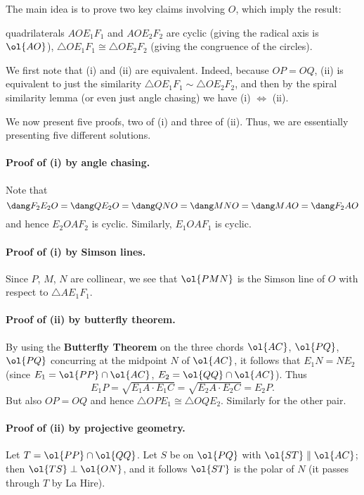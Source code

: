 The main idea is to prove two key claims involving $O$,
which imply the result:
\begin{enumerate}[(i)]
  \ii quadrilaterals $AOE_1F_1$ and $AOE_2F_2$ are cyclic
  (giving the radical axis is $\ol{AO}$),
  \ii $\triangle OE_1F_1 \cong \triangle OE_2F_2$
  (giving the congruence of the circles).
\end{enumerate}
We first note that (i) and (ii) are equivalent.
Indeed, because $OP = OQ$, (ii)
is equivalent to just the similarity $\triangle OE_1F_1 \sim \triangle OE_2F_2$,
and then by the spiral similarity lemma
(or even just angle chasing) we have (i) $\iff$ (ii).

We now present five proofs, two of (i) and three of (ii).
Thus, we are essentially presenting five different solutions.

\paragraph{Proof of (i) by angle chasing.}
Note that
\[ \dang F_2E_2O = \dang QE_2O = \dang QNO = \dang MNO
  = \dang MAO = \dang F_2AO \]
and hence $E_2OAF_2$ is cyclic.
Similarly, $E_1OAF_1$ is cyclic.

\paragraph{Proof of (i) by Simson lines.}
Since $P$, $M$, $N$ are collinear,
we see that $\ol{PMN}$ is the Simson line of $O$
with respect to $\triangle AE_1F_1$.

\paragraph{Proof of (ii) by butterfly theorem.}
By using the \textbf{Butterfly Theorem}
on the three chords $\ol{AC}$, $\ol{PQ}$, $\ol{PQ}$ concurring at the midpoint $N$
of $\ol{AC}$, it follows that $E_1N = NE_2$
(since $E_1 = \ol{PP} \cap \ol{AC}$, $E_2 = \ol{QQ} \cap \ol{AC}$).
Thus \[ E_1P = \sqrt{E_1A \cdot E_1C} = \sqrt{E_2A \cdot E_2C} = E_2P. \]
But also $OP = OQ$ and hence
$\triangle OPE_1 \cong \triangle OQE_2$.
Similarly for the other pair.

\paragraph{Proof of (ii) by projective geometry.}
Let $T = \ol{PP} \cap \ol{QQ}$.
Let $S$ be on $\ol{PQ}$ with $\ol{ST} \parallel \ol{AC}$;
then $\ol{TS} \perp \ol{ON}$,
and it follows $\ol{ST}$ is the polar of $N$
(it passes through $T$ by La Hire).

